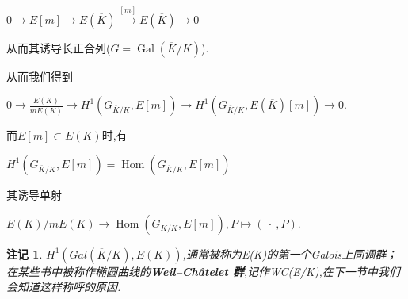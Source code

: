 \documentclass[11pt]{ctexart}
\DeclareMathOperator{\Hom}{Hom}
\DeclareMathOperator{\Gal}{Gal}
\newtheorem{rem}{注记}[section]
\begin{document}
\begin{center}
    $0 \rightarrow E[m]\rightarrow  E(\overline{K})\stackrel{[m]} {\rightarrow}  E(\overline{K})\rightarrow 0$
\end{center}
\noindent 从而其诱导长正合列($G=\Gal(\overline{K}/K)$).
\begin{center}
     
     
     
     
\end{center}
从而我们得到
\begin{center}
    $0\rightarrow\frac{E(K)}{mE(K)}\rightarrow H^1(G_{\overline{K}/K},E[m])\rightarrow H^1(G_{\overline{K}/K},E(\overline{K})[m])\rightarrow 0$.
\end{center}
而$E[m] \subset E(K)$时,有
\begin{center}
   $ H^1(G_{\overline{K}/K},E[m])=\Hom(G_{\overline{K}/K},E[m])$
\end{center}
其诱导单射
\begin{center}
    $E(K)/mE(K) \rightarrow \Hom(G_{\overline{K}/K},E[m]),P\mapsto (~·~,P)$.
\end{center}

\begin{rem}\label{wcg}$H^1(Gal(\overline{K}/K),E(K))$,通常被称为E(K)的第一个Galois上同调群；在某些书中被称作椭圆曲线的\textbf{Weil--Châtelet 群},记作\textup{WC}(E/K),在下一节中我们会知道这样称呼的原因.



\end{rem}
\end{document}
